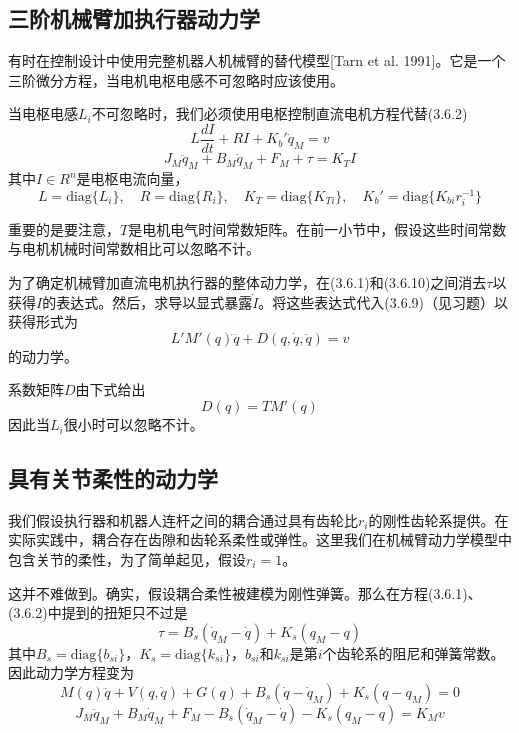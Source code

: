 \documentclass[12pt,a4paper]{ctexart}
\begin{document}
\subsection{三阶机械臂加执行器动力学}

有时在控制设计中使用完整机器人机械臂的替代模型[Tarn et al. 1991]。它是一个三阶微分方程，当电机电枢电感不可忽略时应该使用。

当电枢电感$L_i$不可忽略时，我们必须使用电枢控制直流电机方程代替(3.6.2)
\begin{equation}
L\frac{dI}{dt} + RI + K_b'\dot{q}_M = v
\end{equation}
\begin{equation}
J_M\ddot{q}_M + B_M\dot{q}_M + F_M + \tau = K_T I
\end{equation}
其中$I \in R^n$是电枢电流向量，
\begin{equation}
L = \text{diag}\{L_i\}, \quad R = \text{diag}\{R_i\}, \quad K_T = \text{diag}\{K_{Ti}\}, \quad K_b' = \text{diag}\{K_{bi}r_i^{-1}\}
\end{equation}

重要的是要注意，$T$是电机电气时间常数矩阵。在前一小节中，假设这些时间常数与电机机械时间常数相比可以忽略不计。

为了确定机械臂加直流电机执行器的整体动力学，在(3.6.1)和(3.6.10)之间消去$\tau$以获得$I$的表达式。然后，求导以显式暴露$\dot{I}$。将这些表达式代入(3.6.9)（见习题）以获得形式为
\begin{equation}
L'M'(q)\dddot{q} + D(q,\dot{q},\ddot{q}) = v
\end{equation}
的动力学。

系数矩阵$D$由下式给出
\begin{equation}
D(q) = TM'(q)
\end{equation}
因此当$L_i$很小时可以忽略不计。

\subsection{具有关节柔性的动力学}

我们假设执行器和机器人连杆之间的耦合通过具有齿轮比$r_i$的刚性齿轮系提供。在实际实践中，耦合存在齿隙和齿轮系柔性或弹性。这里我们在机械臂动力学模型中包含关节的柔性，为了简单起见，假设$r_i = 1$。

这并不难做到。确实，假设耦合柔性被建模为刚性弹簧。那么在方程(3.6.1)、(3.6.2)中提到的扭矩只不过是
\begin{equation}
\tau = B_s(\dot{q}_M - \dot{q}) + K_s(q_M - q)
\end{equation}
其中$B_s = \text{diag}\{b_{si}\}$，$K_s = \text{diag}\{k_{si}\}$，$b_{si}$和$k_{si}$是第$i$个齿轮系的阻尼和弹簧常数。因此动力学方程变为
\begin{equation}
M(q)\ddot{q} + V(q,\dot{q}) + G(q) + B_s(\dot{q} - \dot{q}_M) + K_s(q - q_M) = 0
\end{equation}
\begin{equation}
J_M\ddot{q}_M + B_M\dot{q}_M + F_M - B_s(\dot{q}_M - \dot{q}) - K_s(q_M - q) = K_M v
\end{equation}
\end{document}
